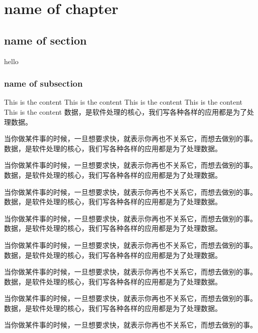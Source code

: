 \documentclass[11pt, a4paper]{book}
\begin{document}
\chapter{name of chapter}
\section{name of section}
hello
\subsection{name of subsection}
This is the content
This is the content
This is the content
This is the content
This is the content
数据，是软件处理的核心，我们写各种各样的应用都是为了处理数据。

当你做某件事的时候，一旦想要求快，就表示你再也不关系它，而想去做别的事。数据，是软件处理的核心，我们写各种各样的应用都是为了处理数据。

当你做某件事的时候，一旦想要求快，就表示你再也不关系它，而想去做别的事。数据，是软件处理的核心，我们写各种各样的应用都是为了处理数据。

当你做某件事的时候，一旦想要求快，就表示你再也不关系它，而想去做别的事。数据，是软件处理的核心，我们写各种各样的应用都是为了处理数据。

当你做某件事的时候，一旦想要求快，就表示你再也不关系它，而想去做别的事。数据，是软件处理的核心，我们写各种各样的应用都是为了处理数据。

当你做某件事的时候，一旦想要求快，就表示你再也不关系它，而想去做别的事。数据，是软件处理的核心，我们写各种各样的应用都是为了处理数据。

当你做某件事的时候，一旦想要求快，就表示你再也不关系它，而想去做别的事。数据，是软件处理的核心，我们写各种各样的应用都是为了处理数据。

当你做某件事的时候，一旦想要求快，就表示你再也不关系它，而想去做别的事。数据，是软件处理的核心，我们写各种各样的应用都是为了处理数据。

当你做某件事的时候，一旦想要求快，就表示你再也不关系它，而想去做别的事。
\end{document}
